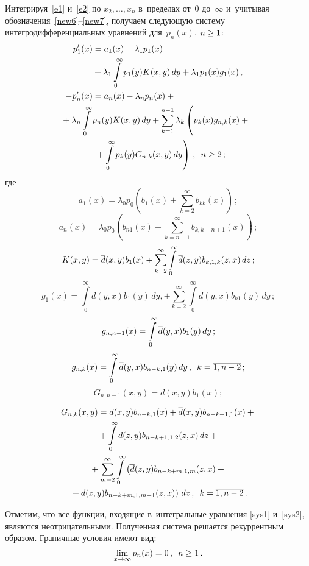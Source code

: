 \begin{multicols}{2}
\noindent 
Интегрируя~\eqref{e1} и~\eqref{e2} по
$x_2,\ldots ,x_n$ в~пределах от~0 до~$\infty$ и~учитывая 
обозначения~\eqref{new6}--\eqref{new7}, получаем следующую
систему интегродифференциальных уравнений
для~$p_{n}(x)$, $n\hm\ge 1$:
\begin{align}
-p'_1(x) &=a_1(x)
-\lambda_1 p_1(x)+{}\notag\\
&{}+\lambda_1\int\limits_0^\infty
p_1(y)K(x,y)\, dy+\lambda_1p_1(x)g_{1}(x)\,, \label{sys1}
\\
-p'_n(x)&=a_n(x)-\lambda_n p_n(x)+{}\notag\\
&\hspace*{-13mm}{}+\lambda_n \int\limits_0^\infty p_n(y) K(x,y) \, dy +
\sum\limits_{k=1}^{n-1} \lambda_k \left(
\vphantom{\int\limits_0^\infty}
p_k(x) g_{n,k}(x)+ {}\right.\notag\\
&\left.{}+\int\limits_0^\infty p_k(y) G_{n,k}(x,y) \, dy
\right)\,, \enskip n \ge 2\,;
\label{sys2}
\end{align}
где
$$
a_1(x) = \lambda_0 p_0
\left( b_1(x) + \sum\limits_{k=2}^\infty b_{kk}(x) \right)\,;
$$
$$
a_n(x)= \lambda_0 p_0 \left(
b_{n1}(x) + \sum\limits_{k=n+1}^\infty b_{k,k-n+1}(x)
\right)\,;
$$
$$
K(x,y)= \overline d(x,y) b_{1}(x) + \sum\limits_{k=2}^{\infty}
\int\limits_0^\infty \overline d(z,y) b_{k,1,k}(z,x) \, dz\,;
$$
$$
g_{1}(x)= \int\limits_0^\infty
 d(y,x) b_{1}(y)\, dy, + \sum\limits_{k=2}^\infty
\int\limits_0^\infty  d(y,x) b_{k1}(y)\, dy\,;
$$
$$
g_{n,n-1}(x)= \int\limits_0^\infty \overline d(y,x)
b_{1}(y)\, dy\,; 
$$
$$
g_{n,k}(x)= \int\limits_0^\infty \overline d(y,x) b_{n-k,1}(y) \, dy\,, \enskip 
k=\overline{1,n-2}\,;
$$
$$
G_{n,n-1}(x,y)= d(x,y) b_{1}(x);
$$

\vspace*{-12pt}

\noindent
\begin{multline*}
G_{n,k}(x,y)= d(x,y) b_{n-k,1}(x) + \overline d(x,y) b_{n-k+1,1}(x)
+{}\\
{}+ \int\limits_0^\infty d(z,y) b_{n-k+1,1,2}(z,x)\, dz +{}
\\
{}+
\sum\limits_{m=2}^{\infty}
\int\limits_0^\infty
\left( \overline d(z,y)
b_{n-k+m,1,m}(z,x)
+{}\right.\\
\left.{}+ d(z,y) b_{n-k+m,1,m+1}(z,x) \right)\, dz\,, \enskip
 k=\overline{1,n-2}\,.
\end{multline*}

\noindent
Отметим, что все функции, входящие в~интегральные уравнения \eqref{sys1} и~\eqref{sys2},
являются неотрицательными.
Полученная система решается рекуррентным образом.
Граничные условия имеют вид:
$$
\lim\limits_{x\to \infty} p_{n}(x)= 0\,,\enskip
n\ge 1\,.
$$


\end{multicols}
